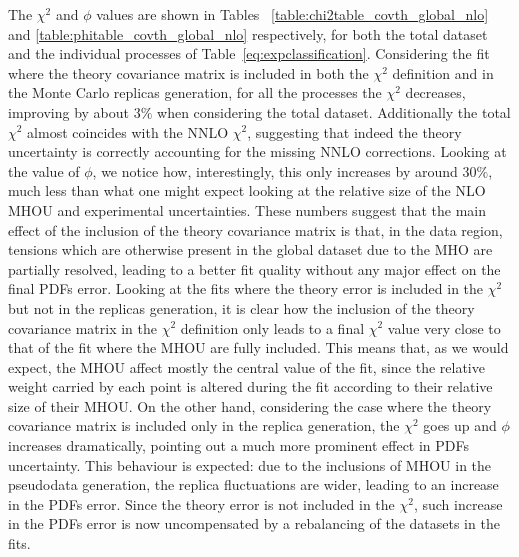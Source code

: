     The $\chi^2$ and $\phi$ values are shown in Tables ~\ref{table:chi2table_covth_global_nlo}
    and \ref{table:phitable_covth_global_nlo} respectively, for both the total dataset and the individual processes of 
    Table~\ref{eq:expclassification}.
    Considering the fit where the theory covariance matrix is included in both the $\chi^2$ definition
    and in the Monte Carlo replicas generation,
    for all the processes the $\chi^2$ decreases, improving
    by about $3\%$ when considering the total dataset. Additionally the total $\chi^2$ almost coincides with the NNLO 
    $\chi^2$, suggesting that indeed the theory uncertainty is correctly accounting for the missing NNLO corrections.
    Looking at the value of $\phi$, we notice how, interestingly, this only increases by around $30\%$, 
    much less than what one might expect looking at the relative size of the NLO MHOU and experimental uncertainties.
    These numbers suggest that the main effect of the inclusion of the theory covariance matrix is that,
    in the data region, tensions which are otherwise present in the global dataset due to the MHO are partially resolved,
    leading to a better fit quality without any major effect on the final PDFs error. 
    Looking at the fits where the theory error is included in the $\chi^2$ but not in the replicas generation,
    it is clear how the inclusion of the theory covariance matrix in the 
    $\chi^2$ definition only leads to a final $\chi^2$ value very close to that of the fit where the MHOU are fully included.
    This means that, as we would expect, the MHOU affect mostly the central value of the fit,
    since the relative weight carried by each point is altered during the fit according to their relative size of their MHOU.
    On the other hand, considering the case where the theory covariance matrix is included only in the replica generation, 
    the $\chi^2$ goes up and $\phi$ increases dramatically, pointing out a much more prominent effect in PDFs uncertainty.
    This behaviour is expected: due to the inclusions of MHOU in the pseudodata generation, the replica fluctuations are wider,
    leading to an increase in the PDFs error. Since the theory error is not included in the $\chi^2$,
    such increase in the PDFs error is now uncompensated by a rebalancing of the datasets in the fits.
      
     
    
